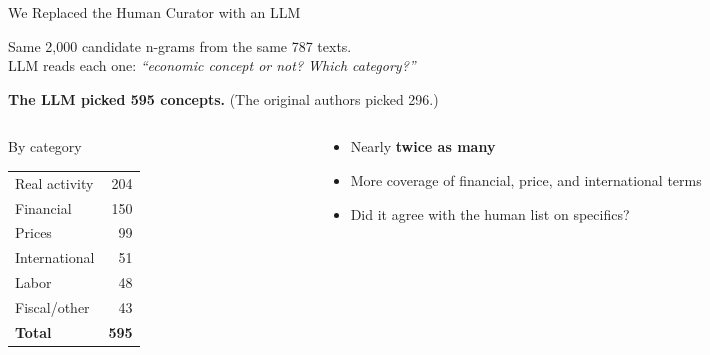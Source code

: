 \documentclass[10pt,aspectratio=169]{beamer}
\begin{document}
\begin{frame}{We Replaced the Human Curator with an LLM}
  \vspace{2pt}
  \begin{block}{}
    \small Same 2,000 candidate n-grams from the same 787 texts.\\
    LLM reads each one: \textit{``economic concept or not? Which category?''}
  \end{block}
  \vspace{4pt}
  \begin{center}
    \large\textbf{The LLM picked \textcolor{blue!60!black}{595} concepts.}
    \quad\normalsize (The original authors picked 296.)
  \end{center}
  \vspace{4pt}
  \begin{columns}[T]
    \begin{column}{0.48\textwidth}
      \begin{block}{By category}
        \vspace{-4pt}\footnotesize
        \begin{tabular}{lr}
          Real activity & 204 \\
          Financial     & 150 \\
          Prices        & 99  \\
          International & 51  \\
          Labor         & 48  \\
          Fiscal/other  & 43  \\ \midrule
          \textbf{Total} & \textbf{595} \\
        \end{tabular}
      \end{block}
    \end{column}
    \begin{column}{0.52\textwidth}
      \begin{block}{}
        \footnotesize
        \begin{itemize}
          \item Nearly \textbf{twice as many}
          \item More coverage of financial, price, and international terms
          \item Did it agree with the human list on specifics?
        \end{itemize}
      \end{block}
    \end{column}
  \end{columns}
\end{frame}
\end{document}
